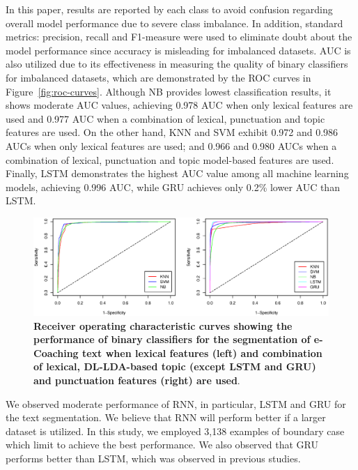 \documentclass{amia}
\begin{document}

In this paper, results are reported by each class to avoid confusion regarding overall model performance due to severe class imbalance. In addition, standard metrics: precision, recall and F1-measure were used to eliminate doubt about the model performance since accuracy is misleading for imbalanced datasets. AUC is also utilized due to its effectiveness in measuring the quality of binary classifiers for imbalanced datasets\cite{hu2015kernelized}, which are demonstrated by the ROC curves in Figure~\ref{fig:roc-curves}. Although NB provides lowest classification results, it shows moderate AUC values, achieving 0.978 AUC when only lexical features are used and 0.977 AUC when a combination of lexical, punctuation and topic features are used. On the other hand, KNN and SVM exhibit 0.972 and 0.986 AUCs when only lexical features are used; and 0.966 and 0.980 AUCs when a combination of lexical, punctuation and topic model-based features are used. Finally, LSTM demonstrates the highest AUC value among all machine learning models, achieving 0.996 AUC, while GRU achieves only 0.2\% lower AUC than LSTM.   

\begin{figure}[!htb]
    \centering
    \includegraphics[width=1.0\textwidth]{figures/roc-curves.eps}
    \caption{\textbf{Receiver operating characteristic curves showing the performance of binary classifiers for the segmentation of e-Coaching text when lexical features (left) and combination of lexical, DL-LDA-based topic (except LSTM and GRU) and punctuation features (right) are used}.}
    \label{fig:roc-curves22}
\end{figure}   

We observed moderate performance of RNN, in particular, LSTM and GRU for the text segmentation. We believe that RNN will perform better if a larger dataset is utilized. In this study, we employed 3,138 examples of boundary case which limit to achieve the best performance. We also observed that GRU performs better than LSTM, which was observed in previous studies\cite{chung2014empirical}.
\end{document}
